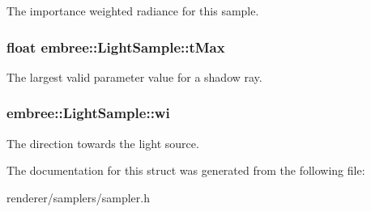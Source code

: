 The importance weighted radiance for this sample. 

\hypertarget{structembree_1_1_light_sample_a7a579c998114bdd44ae60e24739d4734}{
\subsubsection[{tMax}]{\setlength{\rightskip}{0pt plus 5cm}float {\bf embree::LightSample::tMax}}}
\label{structembree_1_1_light_sample_a7a579c998114bdd44ae60e24739d4734}


The largest valid parameter value for a shadow ray. 

\hypertarget{structembree_1_1_light_sample_aff124dbc25b0f7d6a08ab1c0f7e877f4}{
\subsubsection[{wi}]{ {\bf embree::LightSample::wi}}}
\label{structembree_1_1_light_sample_aff124dbc25b0f7d6a08ab1c0f7e877f4}


The direction towards the light source. 



The documentation for this struct was generated from the following file:\begin{DoxyCompactItemize}
\item 
renderer/samplers/sampler.h\end{DoxyCompactItemize}
